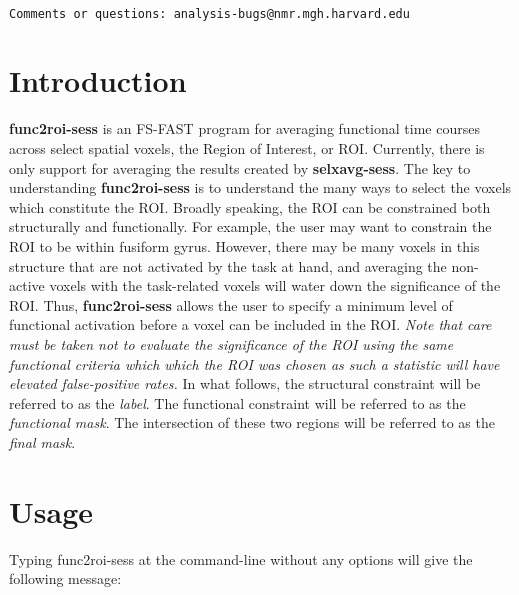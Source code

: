\documentclass[10pt]{article}
\begin{document}
\begin{Large}
 \\
\end{Large}

\noindent 
\begin{verbatim}
Comments or questions: analysis-bugs@nmr.mgh.harvard.edu
\end{verbatim}

\section{Introduction}

{\bf func2roi-sess} is an FS-FAST program for averaging functional
time courses across select spatial voxels, the Region of Interest, or
ROI. Currently, there is only support for averaging the results
created by {\bf selxavg-sess}.  The key to understanding {\bf
func2roi-sess} is to understand the many ways to select the voxels
which constitute the ROI. Broadly speaking, the ROI can be constrained
both structurally and functionally. For example, the user may want to
constrain the ROI to be within fusiform gyrus. However, there may be
many voxels in this structure that are not activated by the task at
hand, and averaging the non-active voxels with the task-related voxels
will water down the significance of the ROI.  Thus, {\bf
func2roi-sess} allows the user to specify a minimum level of
functional activation before a voxel can be included in the ROI. {\em
Note that care must be taken not to evaluate the significance of the
ROI using the same functional criteria which which the ROI was chosen
as such a statistic will have elevated false-positive rates.} In what
follows, the structural constraint will be referred to as the {\em
label}.  The functional constraint will be referred to as the {\em
functional mask}.  The intersection of these two regions will be
referred to as the {\em final mask}.

\section{Usage}
Typing func2roi-sess at the command-line without any options will give the
following message:\\ 
\end{document}
